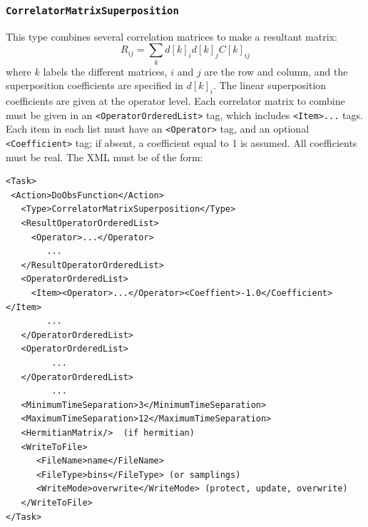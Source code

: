 \documentclass[12pt]{article}
\newcommand{\vb}{\texttt}
\begin{document}
\subsubsection{\vb{CorrelatorMatrixSuperposition}}
This type combines several correlation
matrices to make a resultant matrix:
\[
R_{i j} = \sum_k  d[k]_i d[k]_j  C[k]_{i j}
\]
where $k$ labels the different matrices, $i$ and $j$ are the row and column,
and the superposition coefficients are specified in $d[k]_i$.
The linear superposition coefficients are given at the operator
level.  Each correlator matrix to combine must be given in an
\vb{<OperatorOrderedList>} tag, which includes \vb{<Item>...} tags.  Each
item in each list must have an \vb{<Operator>} tag, and an optional
\vb{<Coefficient>} tag; if absent, a coefficient equal to 1 is assumed.
All coefficients must be real.
The XML must be of the form:
\begin{verbatim}
<Task>
 <Action>DoObsFunction</Action>
   <Type>CorrelatorMatrixSuperposition</Type>
   <ResultOperatorOrderedList>
     <Operator>...</Operator>
        ...
   </ResultOperatorOrderedList>
   <OperatorOrderedList>
     <Item><Operator>...</Operator><Coeffient>-1.0</Coefficient></Item>
        ...
   </OperatorOrderedList>
   <OperatorOrderedList>
         ...
   </OperatorOrderedList>
         ...
   <MinimumTimeSeparation>3</MinimumTimeSeparation>
   <MaximumTimeSeparation>12</MaximumTimeSeparation>
   <HermitianMatrix/>  (if hermitian)
   <WriteToFile>
      <FileName>name</FileName>
      <FileType>bins</FileType> (or samplings)
      <WriteMode>overwrite</WriteMode> (protect, update, overwrite)
   </WriteToFile>
</Task>
\end{verbatim}
\end{document}
